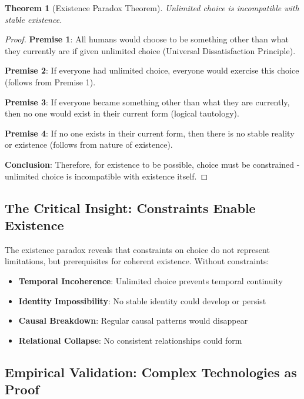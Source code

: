 \documentclass[11pt]{article}
\newtheorem{theorem}{Theorem}[section]
\theoremstyle{remark}
\begin{document}
\begin{theorem}[Existence Paradox Theorem]
Unlimited choice is incompatible with stable existence.
\end{theorem}

\begin{proof}
\textbf{Premise 1}: All humans would choose to be something other than what they currently are if given unlimited choice (Universal Dissatisfaction Principle).

\textbf{Premise 2}: If everyone had unlimited choice, everyone would exercise this choice (follows from Premise 1).

\textbf{Premise 3}: If everyone became something other than what they are currently, then no one would exist in their current form (logical tautology).

\textbf{Premise 4}: If no one exists in their current form, then there is no stable reality or existence (follows from nature of existence).

\textbf{Conclusion}: Therefore, for existence to be possible, choice must be constrained - unlimited choice is incompatible with existence itself.
\end{proof}

\subsection{The Critical Insight: Constraints Enable Existence}

The existence paradox reveals that constraints on choice do not represent limitations, but prerequisites for coherent existence. Without constraints:

\begin{itemize}
\item \textbf{Temporal Incoherence}: Unlimited choice prevents temporal continuity
\item \textbf{Identity Impossibility}: No stable identity could develop or persist
\item \textbf{Causal Breakdown}: Regular causal patterns would disappear
\item \textbf{Relational Collapse}: No consistent relationships could form
\end{itemize}

\subsection{Empirical Validation: Complex Technologies as Proof}
\end{document}
